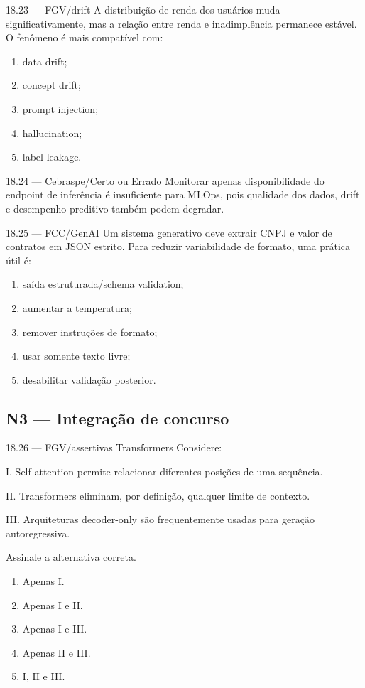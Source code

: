 \begin{questao}{ 18.23 — FGV/drift}
A distribuição de renda dos usuários muda significativamente, mas a relação entre renda e inadimplência permanece estável. O fenômeno é mais compatível com:
\begin{enumerate}[label=\Alph*)]
\item data drift;
\item concept drift;
\item prompt injection;
\item hallucination;
\item label leakage.
\end{enumerate}
\end{questao}

\begin{questao}{ 18.24 — Cebraspe/Certo ou Errado}
Monitorar apenas disponibilidade do endpoint de inferência é insuficiente para MLOps, pois qualidade dos dados, drift e desempenho preditivo também podem degradar.
\end{questao}

\begin{questao}{ 18.25 — FCC/GenAI}
Um sistema generativo deve extrair CNPJ e valor de contratos em JSON estrito. Para reduzir variabilidade de formato, uma prática útil é:
\begin{enumerate}[label=\Alph*)]
\item saída estruturada/schema validation;
\item aumentar a temperatura;
\item remover instruções de formato;
\item usar somente texto livre;
\item desabilitar validação posterior.
\end{enumerate}
\end{questao}

\subsection*{N3 — Integração de concurso}

\begin{questao}{ 18.26 — FGV/assertivas Transformers}
Considere:

I. Self-attention permite relacionar diferentes posições de uma sequência.

II. Transformers eliminam, por definição, qualquer limite de contexto.

III. Arquiteturas decoder-only são frequentemente usadas para geração autoregressiva.

Assinale a alternativa correta.
\begin{enumerate}[label=\Alph*)]
\item Apenas I.
\item Apenas I e II.
\item Apenas I e III.
\item Apenas II e III.
\item I, II e III.
\end{enumerate}
\end{questao}

